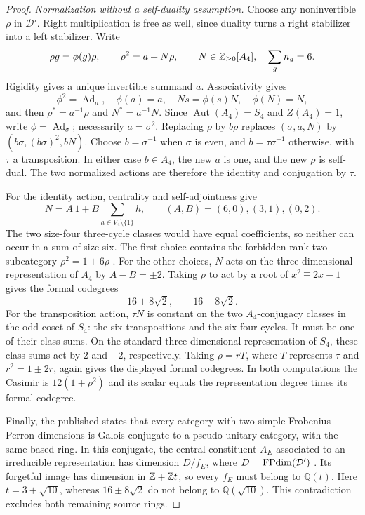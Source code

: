 \begin{proof}
\emph{Normalization without a self-duality assumption.}
Choose any noninvertible $\rho$ in $\mathcal D'$. Right
multiplication is free as well, since duality turns a right
stabilizer into a left stabilizer. Write
\[
 \rho g=\phi(g)\rho,\qquad \rho^2=a+N\rho,
 \qquad N\in\mathbb Z_{\geq0}[A_4],\quad \sum_g n_g=6.
\]
Rigidity gives a unique invertible summand $a$. Associativity gives
\[
 \phi^2=\operatorname{Ad}_a,\quad \phi(a)=a,\quad
 Ns=\phi(s)N,\quad \phi(N)=N,
\]
and then $\rho^*=a^{-1}\rho$ and $N^*=a^{-1}N$.
Since $\operatorname{Aut}(A_4)=S_4$ and $Z(A_4)=1$, write
$\phi=\operatorname{Ad}_\sigma$; necessarily $a=\sigma^2$.
Replacing $\rho$ by $b\rho$ replaces $(\sigma,a,N)$ by
$(b\sigma,(b\sigma)^2,bN)$. Choose $b=\sigma^{-1}$ when $\sigma$
is even, and $b=\tau\sigma^{-1}$ otherwise, with $\tau$ a
transposition. In either case $b\in A_4$, the new $a$ is one,
and the new $\rho$ is self-dual. The two normalized actions are
therefore the identity and conjugation by $\tau$.

For the identity action, centrality and self-adjointness give
\[
 N=A\,1+B\sum_{h\in V_4\setminus\{1\}}h,
 \qquad (A,B)=(6,0),(3,1),(0,2).
\]
The two size-four three-cycle classes would have equal
coefficients, so neither can occur in a sum of size six.
The first choice contains the forbidden rank-two subcategory
$\rho^2=1+6\rho$ \cite{OstrikRank2}.
For the other choices, $N$ acts on the three-dimensional
representation of $A_4$ by $A-B=\pm2$. Taking $\rho$ to act by
a root of $x^2\mp2x-1$ gives the formal codegrees
\[
                         16+8\sqrt2,\qquad16-8\sqrt2.
\]
For the transposition action, $\tau N$ is constant on the two
$A_4$-conjugacy classes in the odd coset of $S_4$: the six
transpositions and the six four-cycles. It must be one of their
class sums. On the standard three-dimensional representation of
$S_4$, these class sums act by $2$ and $-2$, respectively.
Taking $\rho=rT$, where $T$ represents $\tau$ and
$r^2=1\pm2r$, again gives the displayed formal codegrees.
In both computations the Casimir is $12(1+\rho^2)$ and its
scalar equals the representation degree times its formal codegree.

Finally, the published \cite[p.~1628, Lemma~3.1]{Schopieray}
states that every category with two simple Frobenius--Perron
dimensions is Galois conjugate to a pseudo-unitary category, with
the same based ring. In this conjugate, the central constituent
$A_E$ associated to an irreducible representation has dimension
$D/f_E$, where $D=\operatorname{FPdim}(\mathcal D')$
\cite[Theorem~2.13]{OstrikRank3}. Its forgetful image has dimension
in $\mathbb Z+\mathbb Z t$, so every $f_E$ must belong to $\mathbb Q(t)$.
Here $t=3+\sqrt{10}$, whereas $16\pm8\sqrt2$ do not belong to
$\mathbb Q(\sqrt{10})$. This contradiction excludes both remaining
source rings.
\end{proof}


